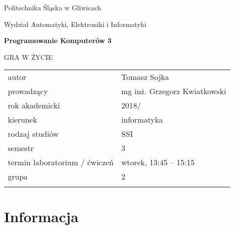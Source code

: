 \documentclass[12pt,a4paper]{article}
\begin{document}
\frenchspacing
\thispagestyle{empty}
\begin{center}
{\Large\sf Politechnika Śląska w Gliwicach   %

Wydział Automatyki, Elektroniki i Informatyki

}

\vfill


\vfill\vfill

{\Huge\sffamily\bfseries Programowanie Komputerów 3} \\ %

\vfill\vfill

{\LARGE\sf GRA W ŻYCIE}  %


\vfill \vfill\vfill\vfill



\begin{tabular}{ll}
\toprule
	autor                                                  & Tomasz Sojka          \\
	prowadzący                                             & mg inż. Grzegorz Kwiatkowski       \\
	rok akademicki                                         & 2018/\the\year \\
	kierunek                                               & informatyka                 \\
	rodzaj studiów                                         & SSI                         \\
	semestr                                                & 3                           \\
	termin laboratorium / ćwiczeń                          & wtorek, 13:45 -- 15:15      \\
	grupa                                                  & 2                           \\
\bottomrule &  \\
\end{tabular}

\end{center}
\cleardoublepage

\section{Informacja}
\end{document}
